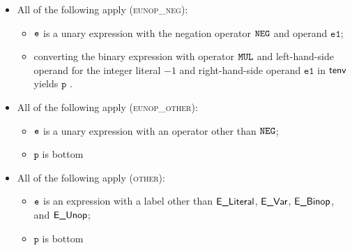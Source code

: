 \documentclass{book}
\newcommand\vp[0]{\texttt{p}}
\newcommand\veone[0]{\texttt{e1}}
\begin{document}
\begin{itemize}
  \item All of the following apply (\textsc{eunop\_neg}):
  \begin{itemize}
    \item $\texttt{e}$ is a unary expression with the negation operator $\texttt{NEG}$ and operand $\veone$;
    \item converting the binary expression with operator $\texttt{MUL}$ and left-hand-side operand for the integer literal $-1$ and
    right-hand-side operand $\veone$ in $\textsf{tenv}$ yields $\vp$ \ProseOrTypeErrorOrBot.
  \end{itemize}

  \item All of the following apply (\textsc{eunop\_other}):
  \begin{itemize}
    \item $\texttt{e}$ is a unary expression with an operator other than $\texttt{NEG}$;
    \item $\vp$ is bottom
  \end{itemize}

  \item All of the following apply (\textsc{other}):
  \begin{itemize}
    \item $\texttt{e}$ is an expression with a label other than $\textsf{E\_Literal}$, $\textsf{E\_Var}$, $\textsf{E\_Binop}$, and $\textsf{E\_Unop}$;
    \item $\vp$ is bottom
  \end{itemize}
\end{itemize}
\end{document}
